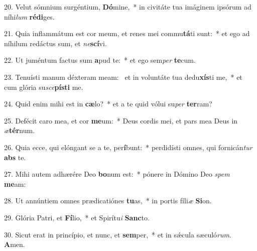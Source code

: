 20. Velut sómnium surgéntium, \textbf{Dó}mine,~*  in civitáte tua imáginem ipsórum ad níhi\textit{lum} \textbf{réd}\textbf{i}ges.\

21. Quia inflammátum est cor meum, et renes mei commu\textbf{tá}ti sunt:~*  et ego ad níhilum redáctus sum, et \textit{ne}\textbf{scí}vi.\

22. Ut juméntum factus sum \textbf{a}pud te:~*  et ego sem\textit{per} \textbf{te}cum.\

23. Tenuísti manum déxteram meam: \dag\  et in voluntáte tua dedu\textbf{xís}ti me,~*  et cum glória su\textit{sce}\textbf{pís}\textbf{ti} me.\

24. Quid enim mihi est in \textbf{cæ}lo?~*  et a te quid vólui su\textit{per} \textbf{ter}ram?\

25. Defécit caro mea, et cor \textbf{me}um:~*  Deus cordis mei, et pars mea Deus in \textit{æ}\textbf{tér}num.\

26. Quia ecce, qui elóngant se a te, per\textbf{í}bunt:~*  perdidísti omnes, qui fornicán\textit{tur} \textbf{abs} te.\

27. Mihi autem adhærére Deo \textbf{bo}num est:~*  pónere in Dómino Deo \textit{spem} \textbf{me}am:\

28. Ut annúntiem omnes prædicatiónes \textbf{tu}as,~*  in portis fíli\textit{æ} \textbf{Si}on.\

29. Glória Patri, et \textbf{Fí}lio,~*  et Spirítu\textit{i} \textbf{Sanc}to.\

30. Sicut erat in princípio, et nunc, et \textbf{sem}per,~*  et in sǽcula sæculó\textit{rum}. \textbf{A}men.\

